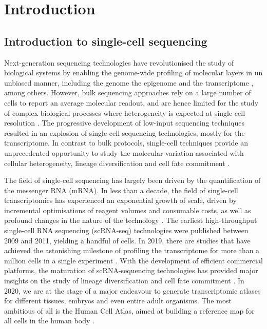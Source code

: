 \graphicspath{{Introduction/Figs/}}

\chapter{Introduction}

\section{Introduction to single-cell sequencing}

Next-generation sequencing technologies have revolutionised the study of biological systems by enabling the genome-wide profiling of molecular layers in un unbiased manner, including the genome \cite{Fleischmann1995} the epigenome \cite{Frommer1992} and the transcriptome \cite{Lister2008,Bainbridge2006,Nagalakshmi2008,Mortazavi2008}, among others. However, bulk sequencing approaches rely on a large number of cells to report an average molecular readout, and are hence limited for the study of complex biological processes where heterogeneity is expected at single cell resolution \cite{Griffiths2018,Papalexi2017,Patel2014}. The progressive development of low-input sequencing techniques resulted in an explosion of single-cell sequencing technologies, mostly for the transcriptome. In contrast to bulk protocols, single-cell techniques provide an unprecedented opportunity to study the molecular variation associated with cellular heterogeneity, lineage diversification and cell fate commitment \cite{Kolodziejczyk2015}.

The field of single-cell sequencing has largely been driven by the quantification of the messenger RNA (mRNA). In less than a decade, the field of single-cell transcriptomics has experienced an exponential growth of scale, driven by incremental optimisations of reagent volumes and consumable costs, as well as profound changes in the nature of the technology \cite{Svensson2018}. The earliest high-throughput single-cell RNA sequencing (scRNA-seq) technologies were published between 2009 and 2011, yielding a handful of cells. In 2019, there are studies that have achieved the astonishing milestone of profiling the transcriptome for more than a million cells in a single experiment \cite{Cao2019}. With the development of efficient commercial platforms, the maturation of scRNA-sequencing technologies has provided major insights on the study of lineage diversification and cell fate commitment \cite{Kolodziejczyk2015,Griffiths2018,Papalexi2017,Patel2014}. In 2020, we are at the stage of a major endeavour to generate transcriptomic atlases for different tissues, embryos and even entire adult organisms. The most ambitious of all is the Human Cell Atlas, aimed at building a reference map for all cells in the human body \cite{Aviv2017}.


